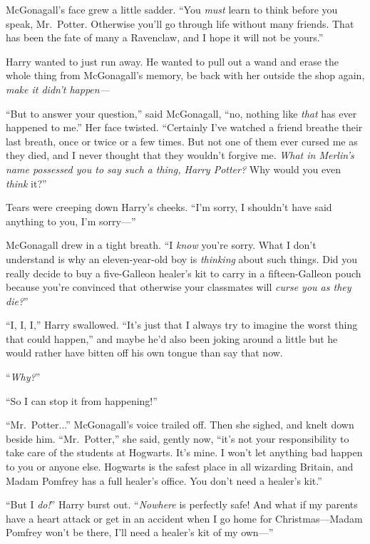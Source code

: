 McGonagall’s face grew a little sadder. “You \emph{must} learn to think before you speak, Mr.~Potter. Otherwise you’ll go through life without many friends. That has been the fate of many a Ravenclaw, and I hope it will not be yours.”

Harry wanted to just run away. He wanted to pull out a wand and erase the whole thing from McGonagall’s memory, be back with her outside the shop again, \emph{make it didn’t happen—}

“But to answer your question,” said McGonagall, “no, nothing like \emph{that} has ever happened to me.” Her face twisted. “Certainly I’ve watched a friend breathe their last breath, once or twice or a few times. But not one of them ever cursed me as they died, and I never thought that they wouldn’t forgive me. \emph{What in Merlin’s name possessed you to say such a thing, Harry Potter?} Why would you even \emph{think} it?”

Tears were creeping down Harry’s cheeks. “I’m sorry, I shouldn’t have said anything to you, I’m sorry—”

McGonagall drew in a tight breath. “I \emph{know} you’re sorry. What I don’t understand is why an eleven-year-old boy is \emph{thinking} about such things. Did you really decide to buy a five-Galleon healer’s kit to carry in a fifteen-Galleon pouch because you’re convinced that otherwise your classmates will \emph{curse you as they die?}”

“I, I, I,” Harry swallowed. “It’s just that I always try to imagine the worst thing that could happen,” and maybe he’d also been joking around a little but he would rather have bitten off his own tongue than say that now.

“\emph{Why?}”

“So I can stop it from happening!”

“Mr.~Potter...” McGonagall’s voice trailed off. Then she sighed, and knelt down beside him. “Mr.~Potter,” she said, gently now, “it’s not your responsibility to take care of the students at Hogwarts. It’s mine. I won’t let anything bad happen to you or anyone else. Hogwarts is the safest place in all wizarding Britain, and Madam Pomfrey has a full healer’s office. You don’t need a healer’s kit.”

“But I \emph{do!}” Harry burst out. “\emph{Nowhere} is perfectly safe! And what if my parents have a heart attack or get in an accident when I go home for Christmas—Madam Pomfrey won’t be there, I’ll need a healer’s kit of my own—”

